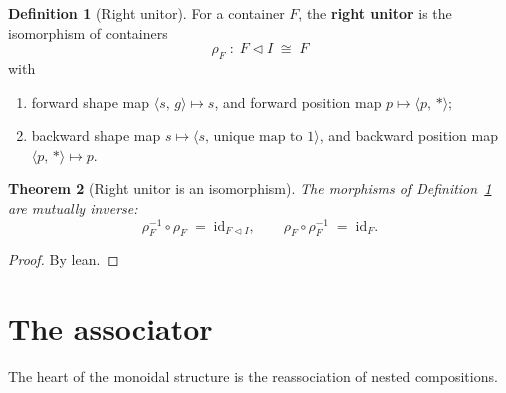 \documentclass[11pt,a4paper]{article}
\theoremstyle{plain}
\newtheorem{theorem}{Theorem}[section]
\theoremstyle{definition}
\newtheorem{definition}[theorem]{Definition}
\newcommand{\id}{\mathrm{id}}
\newcommand{\compop}{\mathbin{\triangleleft}}
\begin{document}
\begin{definition}[Right unitor]\label{def:right-unitor}
For a container $F$, the \textbf{right unitor} is the isomorphism of containers
\begin{equation}
  \rho_F \;:\; F\compop I \;\cong\; F
\end{equation}
with
\begin{enumerate}
  \item forward shape map $\langle s,\,g\rangle\mapsto s$, and
        forward position map $p\mapsto\langle p,\,\ast\rangle$;
  \item backward shape map $s\mapsto\langle s,\,\text{unique map to }1\rangle$,
        and backward position map $\langle p,\,\ast\rangle\mapsto p$.
\end{enumerate}
\end{definition}

\begin{theorem}[Right unitor is an isomorphism]\label{thm:right-unitor}
The morphisms of Definition~\ref{def:right-unitor} are mutually inverse:
\begin{equation}
  \rho_F^{-1}\circ\rho_F \;=\; \id_{F\compop I},
  \qquad
  \rho_F\circ\rho_F^{-1} \;=\; \id_F.
\end{equation}
\end{theorem}

\begin{proof}
By lean.
\end{proof}

\section{The associator}

The heart of the monoidal structure is the reassociation of nested
compositions.
\end{document}
